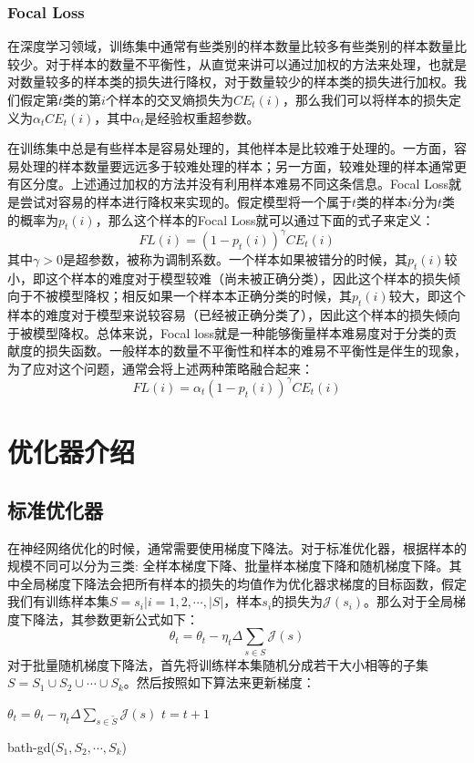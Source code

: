 \documentclass[twoside,a4paper,12pt]{book}%
\begin{document}
\subsubsection{Focal Loss}
在深度学习领域，训练集中通常有些类别的样本数量比较多有些类别的样本数量比较少。对于样本的数量不平衡性，从直觉来讲可以通过加权的方法来处理，也就是对数量较多的样本类的损失进行降权，对于数量较少的样本类的损失进行加权。我们假定第$t$类的第$i$个样本的交叉熵损失为$CE_t(i)$，那么我们可以将样本的损失定义为$\alpha_{t}CE_t(i)$，其中$\alpha_{t}$是经验权重超参数。

在训练集中总是有些样本是容易处理的，其他样本是比较难于处理的。一方面，容易处理的样本数量要远远多于较难处理的样本；另一方面，较难处理的样本通常更有区分度。上述通过加权的方法并没有利用样本难易不同这条信息。Focal Loss就是尝试对容易的样本进行降权来实现的。假定模型将一个属于$t$类的样本$i$分为$t$类的概率为$p_t(i)$，那么这个样本的Focal Loss就可以通过下面的式子来定义：
$$
FL(i)=(1-p_t(i))^{\gamma}CE_t(i)
$$
其中$\gamma>0$是超参数，被称为调制系数。一个样本如果被错分的时候，其$p_t(i)$较小，即这个样本的难度对于模型较难（尚未被正确分类），因此这个样本的损失倾向于不被模型降权；相反如果一个样本本正确分类的时候，其$p_t(i)$较大，即这个样本的难度对于模型来说较容易（已经被正确分类了），因此这个样本的损失倾向于被模型降权。总体来说，Focal loss就是一种能够衡量样本难易度对于分类的贡献度的损失函数。一般样本的数量不平衡性和样本的难易不平衡性是伴生的现象，为了应对这个问题，通常会将上述两种策略融合起来：
$$
FL(i)=\alpha_{t}(1-p_t(i))^{\gamma}CE_t(i)
$$
\section{优化器介绍}
\subsection{标准优化器}
在神经网络优化的时候，通常需要使用梯度下降法。对于标准优化器，根据样本的规模不同可以分为三类:
全样本梯度下降、批量样本梯度下降和随机梯度下降。其中全局梯度下降法会把所有样本的损失的均值作为优化器求梯度的目标函数，假定我们有训练样本集$S={s_i|i=1,2,\cdots,|S|}$，样本$s_i$的损失为$\mathcal{J}(s_i)$。那么对于全局梯度下降法，其参数更新公式如下：
$$
\theta_t = \theta_t - \eta_t \Delta \sum_{s\in S}\mathcal{J}(s)
$$
对于批量随机梯度下降法，首先将训练样本集随机分成若干大小相等的子集$S=S_1\cup S_2 \cup \cdots \cup S_k$。然后按照如下算法来更新梯度：
\begin{algorithm}[h]
    \begin{algorithmic}[1]
    \label{algline:end} 
       \STATE $\theta_t = \theta_t - \eta_t \Delta \sum_{s\in \widetilde{S}}\mathcal{J}(s)$
       \STATE $t = t + 1$
    \ENDFOR 
    \end{algorithmic}
    \caption{bath-gd($S_1,S_2,\cdots,S_k$)}
    \label{alg:alg1}
\end{algorithm}
\end{document}
